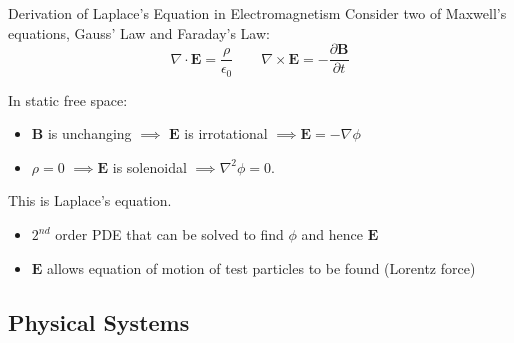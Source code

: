 \documentclass{beamer}
\newcommand{\be}{\begin{equation}}
\newcommand{\ee}{\end{equation}}
\begin{document}
\begin{frame}{Derivation of Laplace's Equation in Electromagnetism}
Consider two of Maxwell's equations, Gauss' Law and Faraday's Law:
%
\be
\nabla \cdot \bm{E} = \frac{\rho}{\epsilon_0} \qquad \nabla \times \bm{E} = -\frac{\partial \bm{B}}{\partial t}
\ee

\pause

In static free space:
\pause
\begin{itemize}
\item $\bm{B}$ is unchanging $\implies$ $\bm{E}$ is irrotational $\implies \bm{E} = -\nabla \phi$
\pause
\item $\rho=0$ $\implies \bm{E}$ is solenoidal $\implies \nabla^2 \phi = 0$.
\end{itemize}

\pause
This is Laplace's equation.
\pause
\begin{itemize}
 \item $2^{nd}$ order PDE that can be solved to find $\phi$ and hence $\bm{E}$
 \pause
 \item $\bm{E}$ allows equation of motion of test particles to be found (Lorentz force)
\end{itemize}
\end{frame}

\subsection{Physical Systems}
\end{document}
